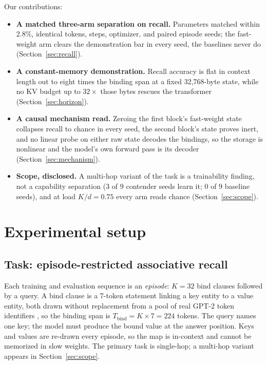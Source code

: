 \documentclass{article}
\begin{document}
Our contributions:
\begin{itemize}
\item \textbf{A matched three-arm separation on recall.} Parameters matched
  within 2.8\%, %
  identical tokens, steps, optimizer, and paired episode seeds; the
  fast-weight arm clears the demonstration bar in every seed, the baselines
  never do (Section~\ref{sec:recall}).
\item \textbf{A constant-memory demonstration.} Recall accuracy is flat in
  context length out to eight times the binding
  span %
  at a fixed 32{,}768-byte
  state, %
  while no KV budget up to $32\times$ those bytes
  rescues the transformer %
  (Section~\ref{sec:horizon}).
\item \textbf{A causal mechanism read.} Zeroing the first block's
  fast-weight state collapses recall to chance in every seed, the second
  block's state proves inert, and no linear probe on either raw state
  decodes the bindings, so the storage is nonlinear and the model's own
  forward pass is its decoder (Section~\ref{sec:mechanism}).
\item \textbf{Scope, disclosed.} A multi-hop variant of the task is a
  trainability finding, not a capability separation (3 of 9 contender
  seeds learn it; 0 of 9 baseline seeds), %
  and at load $K/d = 0.75$ every arm reads chance %
  (Section~\ref{sec:scope}).
\end{itemize}

\section{Experimental setup}
\label{sec:setup}

\subsection{Task: episode-restricted associative recall}

Each training and evaluation sequence is an \emph{episode}: $K = 32$ bind
clauses followed by a query. A bind clause is a 7-token statement linking a
key entity to a value entity, both drawn without replacement from a pool of
real GPT-2 token identifiers \citep{radford2019language}, so the binding
span is $T_{\mathrm{bind}} = K \times 7 = 224$
tokens. %
The query names one key; the model must produce the bound value at the
answer position. Keys and values are re-drawn every episode, so the map is
in-context and cannot be memorized in slow weights. The primary task is
single-hop; a multi-hop variant appears in Section~\ref{sec:scope}.
\end{document}
